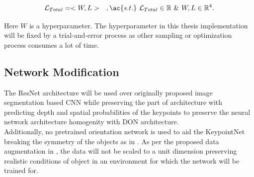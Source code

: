 \begin{equation}
    \label{eqn: weighted_sum}
    \mathcal{L}_{Total} = < W, L > \quad,\ac{s.t.} \ \mathcal{L}_{Total} \in \mathbb{R} \ \& \ W,L \in \mathbb{R}^4.
\end{equation}

Here $W$ is a hyperparameter. The hyperparameter in this thesis implementation will be fixed by a trial-and-error process as other sampling or optimization process consumes a lot of time.

\subsection{Network Modification}

The \ac{ResNet} architecture will be used over originally proposed image segmentation based \ac{CNN} while preserving the part of architecture with
predicting depth and spatial probabilities of the keypoints to preserve the neural network architecture homogenity with \ac{DON} architecture.\\

Additionally, no pretrained orientation network is used to aid the KeypointNet breaking the symmetry of the objects as in \cite{suwajanakorn2018discovery}.
As per the proposed data augmentation in \cite{suwajanakorn2018discovery}, the data will not be scaled to a unit dimension preserving realistic
conditions of object in an environment for which the network will be trained for.



